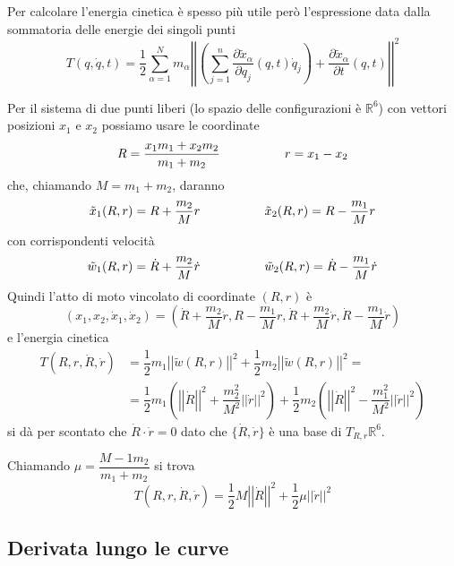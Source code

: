 \documentclass[11pt,a4paper,twoside]{book}
\newenvironment{esempio}[1][Esempio]{ 
  \begin{center}\begin{tcolorbox}[
  title={#1:\\},
  width=0.9\linewidth,
  flush right,
  enhanced jigsaw, 
  colback=white, 
  frame hidden, 
  sharpish corners, arc=3mm,
  borderline west = {1pt}{0pt}{gray},
  borderline south = {1pt}{0pt}{gray},
  coltitle=black, 
  fonttitle=\small\bfseries, 
  attach title to upper, 
  breakable,
  top=2.5pt, bottom=0.3pt]\small
  }{
 \normalsize \end{tcolorbox}\end{center}
}
\theoremstyle{esss}
\theoremstyle{dotless}
\numberwithin{equation}{section} %
\begin{document}
Per calcolare l'energia cinetica è spesso più utile però l'espressione data dalla sommatoria delle energie dei singoli punti
\begin{equation}
T(q,\dot{q},t)=\dfrac{1}{2} \sum_{\alpha=1}^N m_\alpha \left| \left| \left( \sum_{j=1}^n \dfrac{\partial \tilde{x}_\alpha}{\partial q_j} (q,t) \dot{q}_j \right) + \dfrac{\partial \tilde{x}_\alpha}{\partial t} (q,t) \right| \right|^2
\end{equation}

\begin{esempio}[Due punti liberi in coordinate del centro di massa e relative]
Per il sistema di due punti liberi (lo spazio delle configurazioni è $\mathbb{R}^6$) con vettori posizioni $x_1$ e $x_2$ possiamo usare le coordinate 
\[
R=\dfrac{x_1m_1+x_2m_2}{m_1+m_2} \hspace{0.15\linewidth}
r=x_1-x_2
\]
che, chiamando $M=m_1+m_2$, daranno
\[
\tilde{x}_1 (R,r)=R+\dfrac{m_2}{M} r \hspace{0.15\linewidth}
\tilde{x}_2 (R,r) = R-\dfrac{m_1}{M}r
\]
con corrispondenti velocità
\[
\tilde{w}_1(R,r) = \dot{R} + \dfrac{m_2}{M}\dot{r} \hspace{0.15\linewidth}
\tilde{w}_2(R,r) = \dot{R} - \dfrac{m_1}{M}\dot{r}
\]
Quindi l'atto di moto vincolato di coordinate $(R,r)$ è
\[
(x_1,x_2,\dot{x}_1,\dot{x}_2) = \left( \dot{R} + \dfrac{m_2}{M}\dot{r} , R-\dfrac{m_1}{M}r , \dot{R} + \dfrac{m_2}{M}\dot{r} , \dot{R} - \dfrac{m_1}{M}\dot{r} \right)
\]
e l'energia cinetica 
\begin{align*}
T(R,r,\dot{R},\dot{r})&=\dfrac{1}{2} m_1 \left|\left| \tilde{w} (R,r) \right|\right|^2 + \dfrac{1}{2} m_2 \left|\left| \tilde{w} (R,r) \right|\right|^2 =\\
& = \dfrac{1}{2} m_1 \left( \left|\left|\dot{R}\right|\right|^2 + \dfrac{m_2^2}{M^2}\left|\left|\dot{r}\right|\right|^2 \right)+ \dfrac{1}{2} m_2 \left(  \left|\left|\dot{R}\right|\right|^2 - \dfrac{m_1^2}{M^2}\left|\left|\dot{r}\right|\right|^2 \right)
\end{align*}
si dà per scontato che $\dot{R}\cdot\dot{r}=0$ dato che $\{\dot{R},\dot{r}\}$ è una base di $T_{R,r}\mathbb{R}^6$.

Chiamando $\mu=\dfrac{M-1m_2}{m_1+m_2}$ si trova
\[
T(R,r,\dot{R},\dot{r})=\dfrac{1}{2}M\left|\left| \dot{R} \right|\right|^2+ \dfrac{1}{2}\mu\left|\left|\dot{r}\right|\right|^2
\]
\end{esempio}

\subsection{Derivata lungo le curve}
\end{document}
